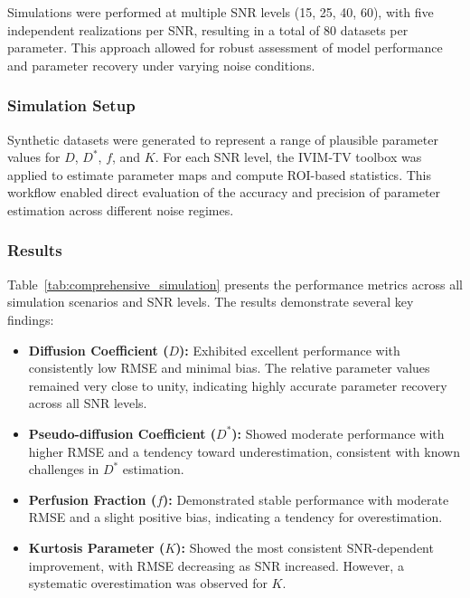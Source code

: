 \documentclass[a4paper,12pt]{article}
\begin{document}
Simulations were performed at multiple SNR levels (15, 25, 40, 60), with five independent realizations per SNR, resulting in a total of 80 datasets per parameter. This approach allowed for robust assessment of model performance and parameter recovery under varying noise conditions.

\subsubsection{Simulation Setup}

Synthetic datasets were generated to represent a range of plausible parameter values for $D$, $D^*$, $f$, and $K$. For each SNR level, the IVIM-TV toolbox was applied to estimate parameter maps and compute ROI-based statistics. This workflow enabled direct evaluation of the accuracy and precision of parameter estimation across different noise regimes.

\subsubsection{Results}

Table~\ref{tab:comprehensive_simulation} presents the performance metrics across all simulation scenarios and SNR levels. The results demonstrate several key findings:

\begin{itemize}
    \item \textbf{Diffusion Coefficient ($D$):} Exhibited excellent performance with consistently low RMSE and minimal bias. The relative parameter values remained very close to unity, indicating highly accurate parameter recovery across all SNR levels.
    \item \textbf{Pseudo-diffusion Coefficient ($D^*$):} Showed moderate performance with higher RMSE and a tendency toward underestimation, consistent with known challenges in $D^*$ estimation.
    \item \textbf{Perfusion Fraction ($f$):} Demonstrated stable performance with moderate RMSE and a slight positive bias, indicating a tendency for overestimation.
    \item \textbf{Kurtosis Parameter ($K$):} Showed the most consistent SNR-dependent improvement, with RMSE decreasing as SNR increased. However, a systematic overestimation was observed for $K$.
\end{itemize}
\end{document}
